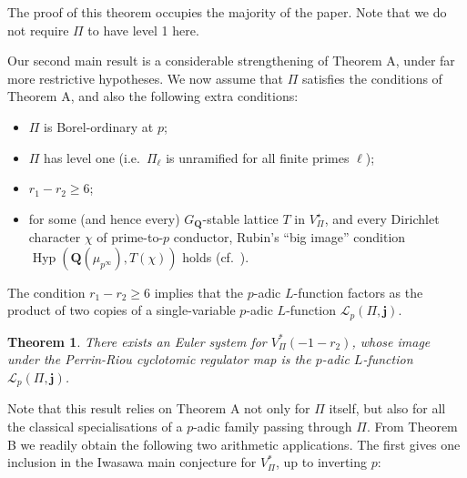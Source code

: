 \documentclass[cjm]{ipart}
\theoremstyle{plain}
\newtheorem{introtheorem}{Theorem}
\theoremstyle{remark}
\DeclareMathOperator{\GSp}{GSp}
\newcommand{\QQ}{\mathbf{Q}}
\newcommand{\bfj}{\mathbf{j}}
\newcommand{\cL}{\mathcal{L}}
\numberwithin{equation}{subsection}
\renewcommand{\ge}{\geqslant}
\begin{document}
 The proof of this theorem occupies the majority of the paper. Note that we do not require $\Pi$ to have level 1 here.
%


 Our second main result is a considerable strengthening of Theorem A, under far more restrictive hypotheses. We now assume that $\Pi$ satisfies the conditions of Theorem A, and also the following extra conditions:
 \begin{itemize}
  \item $\Pi$ is Borel-ordinary at $p$;
  \item $\Pi$ has level one (i.e.~$\Pi_\ell$ is unramified for all finite primes $\ell$);
  \item $r_1 - r_2 \ge 6$;
  \item for some (and hence every) $G_{\QQ}$-stable lattice $T$ in $V_\Pi^\star$, and every Dirichlet character $\chi$ of prime-to-$p$ conductor, Rubin's ``big image'' condition $\operatorname{Hyp}(\QQ(\mu_{p^\infty}), T(\chi))$ holds (cf.~\cite[Assumption 11.1.2]{LSZ17}).
 \end{itemize}
 The condition $r_1 - r_2 \ge 6$ implies that the $p$-adic $L$-function factors as the product of two copies of a single-variable $p$-adic $L$-function $\cL_p(\Pi, \bfj)$.

 \begin{introtheorem}
  \label{thmB}
  There exists an Euler system for $V_\Pi^*(-1-r_2)$, whose image under the Perrin-Riou cyclotomic regulator map is the $p$-adic $L$-function $\cL_p(\Pi, \bfj)$.
 \end{introtheorem}

 Note that this result relies on Theorem A not only for $\Pi$ itself, but also for all the classical specialisations of a $p$-adic family passing through $\Pi$. From Theorem B we readily obtain the following two arithmetic applications. The first gives one inclusion in the Iwasawa main conjecture for $V_\Pi^*$, up to inverting $p$:
\end{document}

